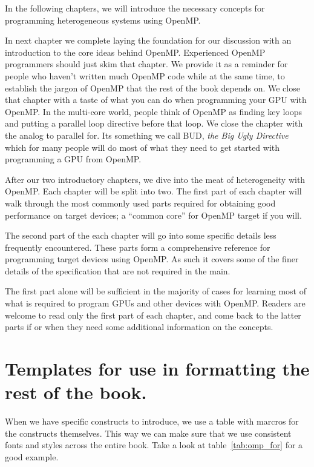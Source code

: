 In the following chapters, we will introduce the necessary concepts for programming heterogeneous systems using OpenMP.

In next chapter we complete laying the foundation for our discussion with an introduction to the core ideas behind OpenMP. 
Experienced OpenMP programmers should just skim that chapter.  We provide 
it as a reminder for people who haven't written much OpenMP code while at the
same time, to establish the jargon of OpenMP that the rest of the book depends on.  We close that chapter with
a taste of what you can do when programming your GPU with OpenMP.   In the multi-core world, people think of OpenMP
as finding key loops and putting a parallel loop directive before that loop.  We close the chapter with the analog to parallel for.  
Its something we call BUD, \emph{the Big Ugly Directive} which for many people will do most of what they need to get started
with programming a GPU from OpenMP.

After our two introductory chapters, we dive into the meat of heterogeneity with OpenMP.  
Each chapter will be split into two.
The first part of each chapter will walk through the most commonly used parts required for obtaining 
good performance on target devices; a ``common core'' for OpenMP target if you will.

The second part of the each chapter will go into some specific details less frequently encountered.
These parts form a comprehensive reference for programming target devices using OpenMP.
As such it covers some of the finer details of the specification that are not required in the main.

The first part alone will be sufficient in the majority of cases for learning most of what is required to 
program GPUs and other devices with OpenMP. Readers are welcome to read only the first part of 
each chapter, and come back to the latter parts if or when they need some additional information on the concepts.


\section{Templates for use in formatting the rest of the book.}


When we have specific constructs to introduce, we use a table with marcros for the constructs themselves.  This way we can make 
sure that we use consistent fonts and styles across the entire book.  Take a look at table~\ref{tab:omp_for} for a good example.

